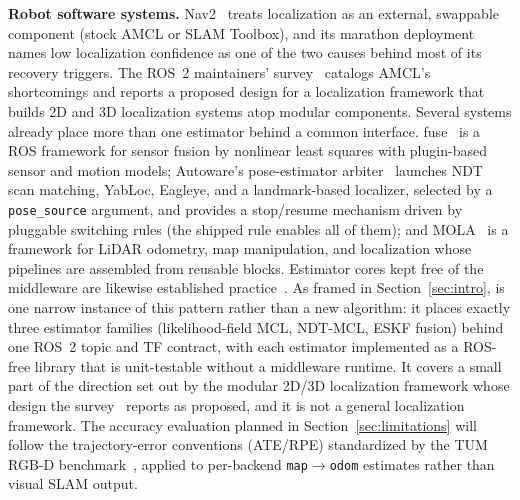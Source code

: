 \textbf{Robot software systems.}
Nav2~\cite{macenski2020marathon} treats localization as an external,
swappable component (stock AMCL or SLAM Toolbox), and its marathon
deployment names low localization confidence as one of the two causes
behind most of its recovery triggers. The ROS~2 maintainers'
survey~\cite{macenski2023survey} catalogs AMCL's shortcomings and
reports a proposed design for a localization framework that builds 2D
and 3D localization systems atop modular components. Several systems
already place more than one estimator behind a common interface.
fuse~\cite{locus2018fuse} is a ROS framework for sensor fusion by
nonlinear least squares with plugin-based sensor and motion models;
Autoware's pose-estimator arbiter~\cite{autoware2024arbiter} launches
NDT scan matching, YabLoc, Eagleye, and a landmark-based localizer,
selected by a \texttt{pose\_source} argument, and provides a
stop/resume mechanism driven by pluggable switching rules (the shipped
rule enables all of them); and MOLA~\cite{blancoclaraco2025mola} is a
framework for LiDAR odometry, map manipulation, and localization whose
pipelines are assembled from reusable blocks. Estimator cores kept free
of the middleware are likewise established
practice~\cite{puga2024beluga,pedrosa2019lama}. As framed in
Section~\ref{sec:intro}, \prismloc{} is one narrow instance of this
pattern rather than a new algorithm: it places exactly three estimator
families (likelihood-field MCL, NDT-MCL, ESKF fusion) behind one ROS~2
topic and TF contract, with each estimator implemented as a ROS-free
library that is unit-testable without a middleware runtime. It covers
a small part of the direction set out by the modular 2D/3D localization
framework whose design the survey~\cite{macenski2023survey} reports as
proposed, and it is not a general localization framework. The accuracy
evaluation planned in
Section~\ref{sec:limitations} will follow the trajectory-error
conventions (ATE/RPE) standardized by the TUM RGB-D
benchmark~\cite{sturm2012benchmark}, applied to per-backend
\texttt{map}$\to$\texttt{odom} estimates rather than visual SLAM
output.

